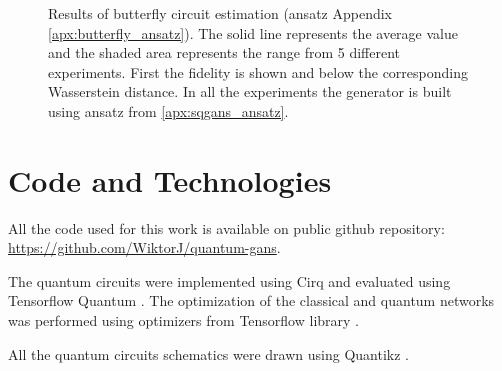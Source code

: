 \begin{figure}[htbp!]
  \caption{Results of butterfly circuit estimation (ansatz Appendix \ref{apx:butterfly_ansatz}).
    The solid line represents the average value and the shaded area
    represents the range from 5 different experiments. First the
    fidelity is shown and below the corresponding Wasserstein distance. In all the
    experiments the generator is built using ansatz from \ref{apx:sqgans_ansatz}.}
  \label{fig:wqgans_res_butterfly_3}
\end{figure}
\let\clearpage\oldclearpage
\chapter{Code and Technologies}
All the code used for this work is available on public github repository:
\url{https://github.com/WiktorJ/quantum-gans}.

The quantum circuits were implemented using Cirq
\cite{https://doi.org/10.5281/zenodo.5138274} and evaluated using Tensorflow
Quantum \cite{broughton2020tensorflow}. The optimization of the classical and
quantum networks was performed using optimizers from Tensorflow library \cite{tensorflow2015-whitepaper}.

All the quantum circuits schematics were drawn using Quantikz \cite{https://doi.org/10.17637/rh.7000520}.



